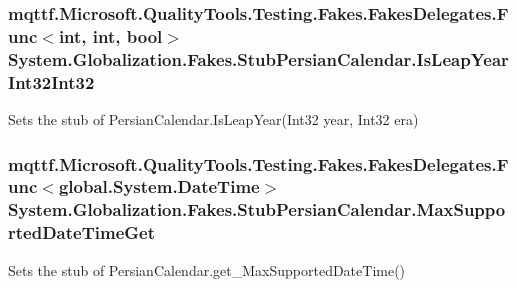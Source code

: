 \hypertarget{class_system_1_1_globalization_1_1_fakes_1_1_stub_persian_calendar_a29e663e848e2178951c14bc4d9643698}{
\subsubsection[{Is\-Leap\-Year\-Int32\-Int32}]{\setlength{\rightskip}{0pt plus 5cm}mqttf.\-Microsoft.\-Quality\-Tools.\-Testing.\-Fakes.\-Fakes\-Delegates.\-Func$<$int, int, bool$>$ System.\-Globalization.\-Fakes.\-Stub\-Persian\-Calendar.\-Is\-Leap\-Year\-Int32\-Int32}}\label{class_system_1_1_globalization_1_1_fakes_1_1_stub_persian_calendar_a29e663e848e2178951c14bc4d9643698}


Sets the stub of Persian\-Calendar.\-Is\-Leap\-Year(\-Int32 year, Int32 era)

\hypertarget{class_system_1_1_globalization_1_1_fakes_1_1_stub_persian_calendar_a5034270f322777040d87482337ff8017}{
\subsubsection[{Max\-Supported\-Date\-Time\-Get}]{\setlength{\rightskip}{0pt plus 5cm}mqttf.\-Microsoft.\-Quality\-Tools.\-Testing.\-Fakes.\-Fakes\-Delegates.\-Func$<$global.\-System.\-Date\-Time$>$ System.\-Globalization.\-Fakes.\-Stub\-Persian\-Calendar.\-Max\-Supported\-Date\-Time\-Get}}\label{class_system_1_1_globalization_1_1_fakes_1_1_stub_persian_calendar_a5034270f322777040d87482337ff8017}


Sets the stub of Persian\-Calendar.\-get\-\_\-\-Max\-Supported\-Date\-Time()

